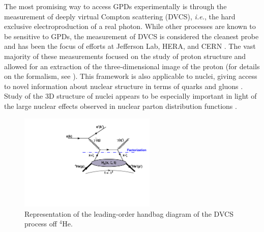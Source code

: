 \documentclass[twocolumn,nofootinbib,showpacs,prl,superscriptaddress,secnumarabic,amssymb,nobibnotes,aps,floatfix]{revtex4}
\begin{document}
The most promising way to access GPDs experimentally is through the measurement 
of deeply virtual Compton scattering (DVCS), \textit{i.e.}, the hard exclusive 
electroproduction of a real photon.  While other processes are known to be 
sensitive to GPDs, the measurement of DVCS is considered the cleanest probe and 
has been the focus of efforts at Jefferson Lab, HERA, and CERN
\cite{Stepanyan:2001sm,Airapetian,Chekanov:2003ya,Aktas:2005ty,Chen:2006na,Munoz 
Camacho:2006hx,Girod:2007aa,Mazouz:2007aa,Gavalian:2009,Seder:2015,Pisano:2015,Jo:2015ema}.  
The vast majority of these measurements focused on the study of proton 
structure and allowed for an extraction of the three-dimensional image of the 
proton (for details on the formalism, see 
\cite{Goeke:2001tz,Diehl:2003ny,Ji:2004gf,Belitsky:2005qn,Boffi:2007yc,Guidal:2013rya}).
This framework is also applicable to nuclei, giving access to novel 
information about nuclear structure in terms of quarks and 
gluons \cite{Dupre:2015jha}.
Study of the 3D structure of nuclei appears to be especially important
in light of the large nuclear effects observed in nuclear parton distribution 
functions \cite{Geesaman:1995yd,Norton:2003cb,Hen:2016kwk}.

\begin{figure}[tb]
\includegraphics[width=6.5cm]{figs/DVCS_diagram.pdf}
\caption{Representation of the leading-order handbag diagram of the DVCS 
process off $^4$He.}
\label{fig:diags}
\end{figure}
\end{document}

